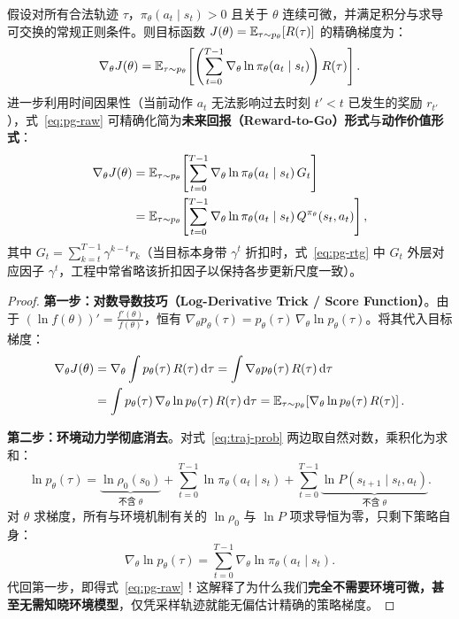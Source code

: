 \begin{thmBox}
\begin{theorem}
\label{thm:pg-theorem}
假设对所有合法轨迹 $\tau$，$\pi_\theta(a_t \mid s_t) > 0$ 且关于 $\theta$ 连续可微，并满足积分与求导可交换的常规正则条件。则目标函数 $J(\theta) = \mathbb{E}_{\tau \sim p_\theta}[R(\tau)]$ 的精确梯度为：
\begin{equation}
  \nabla_\theta J(\theta)
  = \mathbb{E}_{\tau \sim p_\theta}\!\left[\left(\sum_{t=0}^{T-1} \nabla_\theta \ln \pi_\theta(a_t \mid s_t)\right) R(\tau)\right].
  \label{eq:pg-raw}
\end{equation}
进一步利用时间因果性（当前动作 $a_t$ 无法影响过去时刻 $t' < t$ 已发生的奖励 $r_{t'}$），式~\eqref{eq:pg-raw} 可精确化简为\textbf{未来回报（Reward-to-Go）形式}与\textbf{动作价值形式}：
\begin{align}
  \nabla_\theta J(\theta)
  &= \mathbb{E}_{\tau \sim p_\theta}\!\left[\sum_{t=0}^{T-1} \nabla_\theta \ln \pi_\theta(a_t \mid s_t)\, G_t\right]
  \label{eq:pg-rtg} \\
  &= \mathbb{E}_{\tau \sim p_\theta}\!\left[\sum_{t=0}^{T-1} \nabla_\theta \ln \pi_\theta(a_t \mid s_t)\, Q^{\pi_\theta}(s_t, a_t)\right],
  \label{eq:pg-q}
\end{align}
其中 $G_t = \sum_{k=t}^{T-1} \gamma^{k-t} r_k$（当目标本身带 $\gamma^t$ 折扣时，式~\eqref{eq:pg-rtg} 中 $G_t$ 外层对应因子 $\gamma^t$，工程中常省略该折扣因子以保持各步更新尺度一致）。
\end{theorem}
\begin{proof}
\textbf{第一步：对数导数技巧（Log-Derivative Trick / Score Function）}。由于 $(\ln f(\theta))' = \frac{f'(\theta)}{f(\theta)}$，恒有 $\nabla_\theta p_\theta(\tau) = p_\theta(\tau)\,\nabla_\theta \ln p_\theta(\tau)$。将其代入目标梯度：
\begin{align*}
  \nabla_\theta J(\theta)
  &= \nabla_\theta \int p_\theta(\tau)\, R(\tau)\,\mathrm{d}\tau
   = \int \nabla_\theta p_\theta(\tau)\, R(\tau)\,\mathrm{d}\tau \\
  &= \int p_\theta(\tau)\, \nabla_\theta \ln p_\theta(\tau)\, R(\tau)\,\mathrm{d}\tau
   = \mathbb{E}_{\tau \sim p_\theta}\!\left[\nabla_\theta \ln p_\theta(\tau)\, R(\tau)\right].
\end{align*}

\textbf{第二步：环境动力学彻底消去}。对式~\eqref{eq:traj-prob} 两边取自然对数，乘积化为求和：
\[
  \ln p_\theta(\tau) = \underbrace{\ln \rho_0(s_0)}_{\text{不含 }\theta}
  + \sum_{t=0}^{T-1} \ln \pi_\theta(a_t \mid s_t)
  + \sum_{t=0}^{T-1} \underbrace{\ln P(s_{t+1} \mid s_t, a_t)}_{\text{不含 }\theta}.
\]
对 $\theta$ 求梯度，所有与环境机制有关的 $\ln \rho_0$ 与 $\ln P$ 项求导恒为零，只剩下策略自身：
\[
  \nabla_\theta \ln p_\theta(\tau) = \sum_{t=0}^{T-1} \nabla_\theta \ln \pi_\theta(a_t \mid s_t).
\]
代回第一步，即得式~\eqref{eq:pg-raw}！这解释了为什么我们\textbf{完全不需要环境可微，甚至无需知晓环境模型}，仅凭采样轨迹就能无偏估计精确的策略梯度。


\end{proof}
\end{thmBox}
